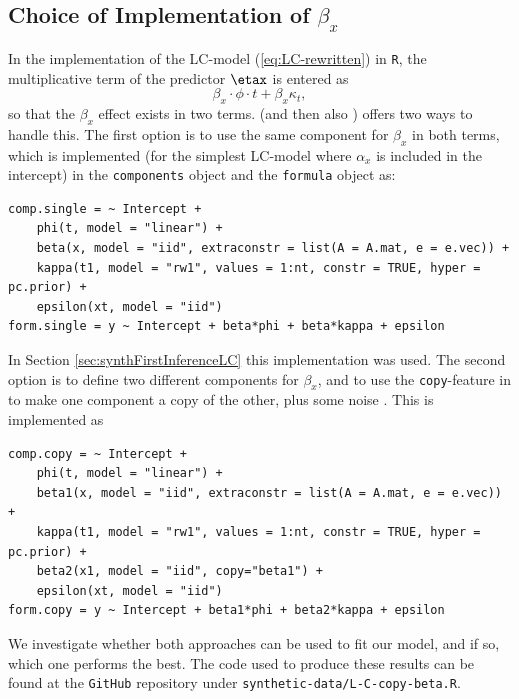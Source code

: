 \subsection{Choice of Implementation of $\beta_x$}
In the implementation of the LC-model (\ref{eq:LC-rewritten}) in \texttt{R}, the multiplicative term of the predictor $\etax$ is entered as
\begin{equation}
    \beta_x\cdot\phi \cdot t + \beta_x\kappa_t,
\end{equation}
so that the $\beta_x$ effect exists in two terms. \inla (and then also \inlabru) offers two ways to handle this. The first option is to use the same component for $\beta_x$ in both terms, which is implemented (for the simplest LC-model where $\alpha_x$ is included in the intercept) in the \texttt{components} object and the \texttt{formula} object as:
\begin{verbatim}
comp.single = ~ Intercept + 
    phi(t, model = "linear") + 
    beta(x, model = "iid", extraconstr = list(A = A.mat, e = e.vec)) + 
    kappa(t1, model = "rw1", values = 1:nt, constr = TRUE, hyper = pc.prior) + 
    epsilon(xt, model = "iid")
form.single = y ~ Intercept + beta*phi + beta*kappa + epsilon
\end{verbatim}
In Section \ref{sec:synthFirstInferenceLC} this implementation was used. The second option is to define two different components for $\beta_x$, and to use the \texttt{copy}-feature in \inla to make one component a copy of the other, plus some noise \cite{MARTINS201368}. This is implemented as
\begin{verbatim}
comp.copy = ~ Intercept + 
    phi(t, model = "linear") + 
    beta1(x, model = "iid", extraconstr = list(A = A.mat, e = e.vec)) + 
    kappa(t1, model = "rw1", values = 1:nt, constr = TRUE, hyper = pc.prior) + 
    beta2(x1, model = "iid", copy="beta1") +
    epsilon(xt, model = "iid")
form.copy = y ~ Intercept + beta1*phi + beta2*kappa + epsilon
\end{verbatim}
We investigate whether both approaches can be used to fit our model, and if so, which one performs the best. The code used to produce these results can be found at the \texttt{GitHub} repository under \texttt{synthetic-data/L-C-copy-beta.R}. 


